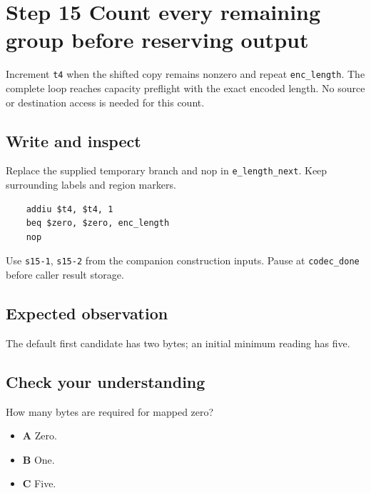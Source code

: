 \section{Step 15 Count every remaining group before reserving output}\label{delta-s15}

Increment \texttt{t4} when the shifted copy remains nonzero and repeat \texttt{enc\_length}. The complete loop reaches capacity preflight with the exact encoded length. No source or destination access is needed for this count.

\subsection{Write and inspect}
Replace the supplied temporary branch and nop in \texttt{e\_length\_next}. Keep surrounding labels and region markers.

\begin{verbatim}
    addiu $t4, $t4, 1
    beq $zero, $zero, enc_length
    nop
\end{verbatim}
Use \texttt{s15-1}, \texttt{s15-2} from the companion construction inputs. Pause at \texttt{codec\_done} before caller result storage.

\subsection{Expected observation}
The default first candidate has two bytes; an initial minimum reading has five.

\subsection{Check your understanding}
How many bytes are required for mapped zero?

\begin{itemize}
  \item \textbf{A} Zero.
  \item \textbf{B} One.
  \item \textbf{C} Five.
\end{itemize}
